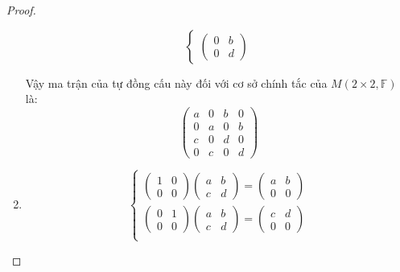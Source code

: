 \documentclass[class=nhvh-linear-algebra,crop=false]{standalone}
\begin{document}
\begin{proof}
\begin{enumerate}[label = (\alph*)]
\[\begin{cases}
\begin{pmatrix}
                          0 & b \\
                          0 & d
                      \end{pmatrix}
                  \end{cases}
              \]
              \par Vậy ma trận của tự đồng cấu này đối với cơ sở chính tắc của $M(2\times 2,\mathbb{F})$ là:
              \[
                  \begin{pmatrix}
                      a & 0 & b & 0 \\
                      0 & a & 0 & b \\
                      c & 0 & d & 0 \\
                      0 & c & 0 & d
                  \end{pmatrix}
              \]
        \item
              \[
                  \begin{cases}
                      \begin{pmatrix}
                          1 & 0 \\
                          0 & 0
                      \end{pmatrix}
                      \begin{pmatrix}
                          a & b \\
                          c & d
                      \end{pmatrix}=
                      \begin{pmatrix}
                          a & b \\
                          0 & 0
                      \end{pmatrix} \\
                      \begin{pmatrix}
                          0 & 1 \\
                          0 & 0
                      \end{pmatrix}
                      \begin{pmatrix}
                          a & b \\
                          c & d
                      \end{pmatrix}=
                      \begin{pmatrix}
                          c & d \\
                          0 & 0
                      \end{pmatrix} \\

\end{cases}\]
\end{enumerate}
\end{proof}
\end{document}

